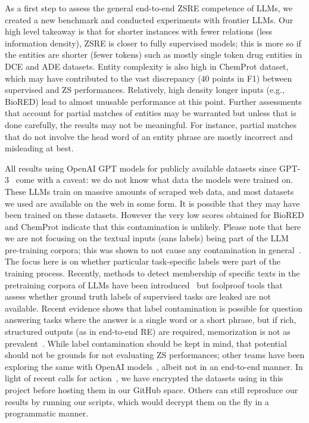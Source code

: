 \documentclass[11pt]{article}
\begin{document}
As a first step to assess the general end-to-end ZSRE competence of LLMs, we created a new benchmark and conducted experiments with frontier LLMs. Our high level takeaway is that for shorter instances with fewer relations (less information density), ZSRE is closer to fully supervised models; this is more so if the entities are shorter (fewer tokens) such as mostly single token drug entities in DCE and ADE datasets. Entity complexity is also high in ChemProt dataset, which may have contributed to the vast discrepancy (40 points in F1) between supervised and ZS performances. Relatively, high density longer inputs (e.g., BioRED) lead to almost unusable performance at this point. Further assessments that account for partial matches of entities may be warranted but unless that is done carefully, the results may not be meaningful. For instance, partial matches that do not involve the head word of an entity phrase are mostly incorrect and misleading at best. %

All results using OpenAI GPT models for publicly available datasets since GPT-3~\cite{brown2020language} come with a caveat: we do not know what data the models were trained on.  These LLMs train on massive amounts of scraped web data, and most datasets we used are available on the web in some form.  It is possible that they may have been trained on these datasets. However the very low scores obtained for BioRED and ChemProt indicate that this contamination is unlikely. Please note that here we are not focusing on the textual inputs (sans labels) being part of the LLM pre-training corpora; this was shown to not cause any contamination in general~\cite{li2024open}. The focus here is on whether particular task-specific labels were part of the training process. Recently, methods to detect membership of specific texts in the pretraining corpora of LLMs have been introduced~\cite{rastogi2025stamp} but foolproof tools that assess whether ground truth labels of supervised tasks are leaked are not available. Recent evidence shows that label contamination is possible for question answering tasks where the answer is a single word or a short phrase, but if rich, structured outputs (as in end-to-end RE) are required, memorization is not as prevalent~\cite{wang2025generalization}. 
While label contamination should be kept in mind, that potential should not be grounds for not evaluating ZS performances; other teams have been exploring the same with OpenAI models~\cite{li2023revisiting,zhang2024study}, albeit not in an end-to-end manner. In light of recent calls for action~\cite{jacovi2023stop}, we have encrypted the datasets using in this project before hosting them in our GitHub space. Others can still reproduce our results by running our scripts, which would decrypt them on the fly in a programmatic manner.   
\end{document}
